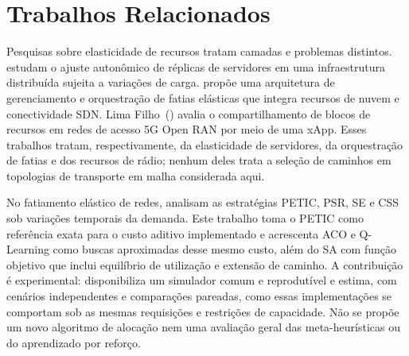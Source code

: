 \section{Trabalhos Relacionados}

Pesquisas sobre elasticidade de recursos tratam camadas e problemas distintos.  estudam o ajuste autonômico de réplicas de servidores em uma infraestrutura distribuída sujeita a variações de carga.  propõe uma arquitetura de gerenciamento e orquestração de fatias elásticas que integra recursos de nuvem e conectividade SDN. Lima Filho~(\citeyear{limafilho2026controle}) avalia o compartilhamento de blocos de recursos em redes de acesso 5G Open RAN por meio de uma xApp. Esses trabalhos tratam, respectivamente, da elasticidade de servidores, da orquestração de fatias e dos recursos de rádio; nenhum deles trata a seleção de caminhos em topologias de transporte em malha considerada aqui.

No fatiamento elástico de redes,  analisam as estratégias PETIC, PSR, SE e CSS sob variações temporais da demanda. Este trabalho toma o PETIC como referência exata para o custo aditivo implementado e acrescenta ACO e Q-Learning como buscas aproximadas desse mesmo custo, além do SA com função objetivo que inclui equilíbrio de utilização e extensão de caminho. A contribuição é experimental: disponibiliza um simulador comum e reprodutível e estima, com cenários independentes e comparações pareadas, como essas implementações se comportam sob as mesmas requisições e restrições de capacidade. Não se propõe um novo algoritmo de alocação nem uma avaliação geral das meta-heurísticas ou do aprendizado por reforço.
